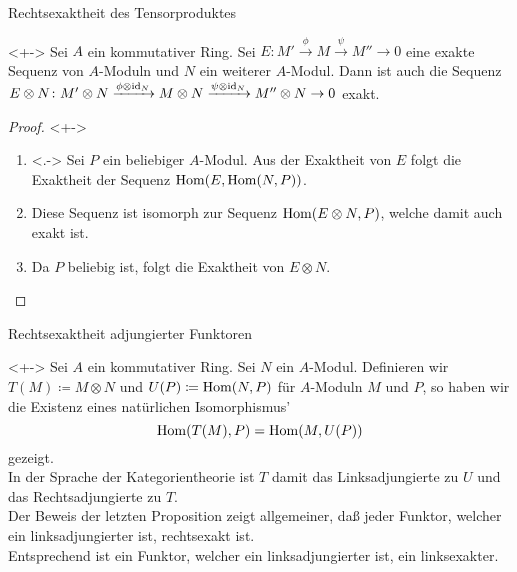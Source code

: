 \begin{frame}{Rechtsexaktheit des Tensorproduktes}
	\begin{proposition}<+->
		Sei \(A\) ein kommutativer Ring. Sei \(E\colon M' \xrightarrow{\phi} M \xrightarrow{\psi} M'' \to 0\)
		eine exakte Sequenz von \(A\)-Moduln und \(N\) ein weiterer \(A\)-Modul. Dann ist auch die Sequenz
		\(E \otimes N\colon M' \otimes N \xrightarrow{\phi \otimes \operatorname{id}_N} M \otimes N \xrightarrow{\psi \otimes \operatorname{id}_N} M'' \otimes N
		\to 0\) exakt.
	\end{proposition}
	\begin{proof}<+->
		\begin{enumerate}[<+->]
		\item<.->
			Sei \(P\) ein beliebiger \(A\)-Modul. Aus der Exaktheit von \(E\) folgt die Exaktheit
			der Sequenz \(\operatorname{Hom}(E, \operatorname{Hom}(N, P))\).
		\item
			Diese Sequenz ist isomorph zur Sequenz \(\operatorname{Hom}(E \otimes N, P)\), welche damit auch exakt ist.
		\item
			Da \(P\) beliebig ist, folgt die Exaktheit von \(E \otimes N\).
			\qedhere
		\end{enumerate}
	\end{proof}
\end{frame}

\begin{frame}{Rechtsexaktheit adjungierter Funktoren}
	\begin{remark}<+->
		Sei \(A\) ein kommutativer Ring. Sei \(N\) ein \(A\)-Modul. Definieren wir
		\(T(M) \coloneqq M \otimes N\) und \(U(P) \coloneqq \operatorname{Hom}(N, P)\) für \(A\)-Moduln
		\(M\) und \(P\), so haben wir die Existenz eines natürlichen Isomorphismus'
		\[
			\operatorname{Hom}(T(M), P) = \operatorname{Hom}(M, U(P))
		\]
		gezeigt.
		\\
		In der Sprache der Kategorientheorie ist \(T\) damit das Linksadjungierte zu \(U\) und
		das Rechtsadjungierte zu \(T\).
		\\
		Der Beweis der letzten Proposition zeigt allgemeiner, daß jeder Funktor, welcher
		ein linksadjungierter ist, rechtsexakt ist.
		\\
		Entsprechend ist ein Funktor, welcher ein linksadjungierter ist, ein linksexakter.
	\end{remark}
\end{frame}

